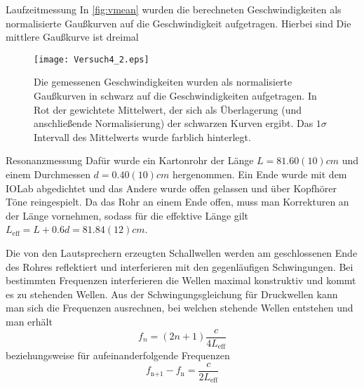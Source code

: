 \documentclass{alex_gp}
\begin{document}
\begin{mybox}{Laufzeitmessung}
	In \autoref{fig:vmean} wurden die berechneten Geschwindigkeiten als normalisierte Gaußkurven auf die Geschwindigkeit aufgetragen. Hierbei sind 
	Die mittlere Gaußkurve ist dreimal 
	\begin{figure}[H]	
		\centering
		\texttt{[image: Versuch4\_2.eps]}
		\caption{Die gemessenen Geschwindigkeiten wurden als normalisierte Gaußkurven in schwarz auf die Geschwindigkeiten aufgetragen. In Rot der gewichtete Mittelwert, der sich als Überlagerung (und anschließende Normalisierung) der schwarzen Kurven ergibt. Das \( 1\sigma \) Intervall des Mittelwerts wurde farblich hinterlegt.}
		\label{fig:vmean}
	\end{figure}
\end{mybox}

\begin{mybox}{Resonanzmessung}
	Dafür wurde ein Kartonrohr der Länge \( L = 81.60(10) \unit{cm} \) und einem Durchmessen \( d = 0.40(10) \unit{cm} \) hergenommen. Ein Ende wurde mit dem IOLab abgedichtet und das Andere wurde offen gelassen und über Kopfhörer Töne reingespielt. Da das Rohr an einem Ende offen, muss man Korrekturen an der Länge vornehmen, sodass für die effektive Länge gilt \( L_{\text{eff}} = L + 0.6d = 81.84(12) \unit{cm} \).
	
	Die von den Lautsprechern erzeugten Schallwellen werden am geschlossenen Ende des Rohres reflektiert und interferieren mit den gegenläufigen Schwingungen. Bei bestimmten Frequenzen interferieren die Wellen maximal konstruktiv und kommt es zu stehenden Wellen. Aus der Schwingungsgleichung für Druckwellen kann man sich die Frequenzen ausrechnen, bei welchen stehende Wellen entstehen und man erhält
	\begin{equation}\label{key}
		f_n = (2n+1)\frac{c}{4L_{\text{eff}}}
	\end{equation}
    beziehungsweise für aufeinanderfolgende Frequenzen
    \begin{equation}\label{key}
    	f_{\text{n+1}} - f_{\text{n}} = \frac{c}{2L_{\text{eff}}}
    \end{equation}
\end{mybox}
\end{document}
